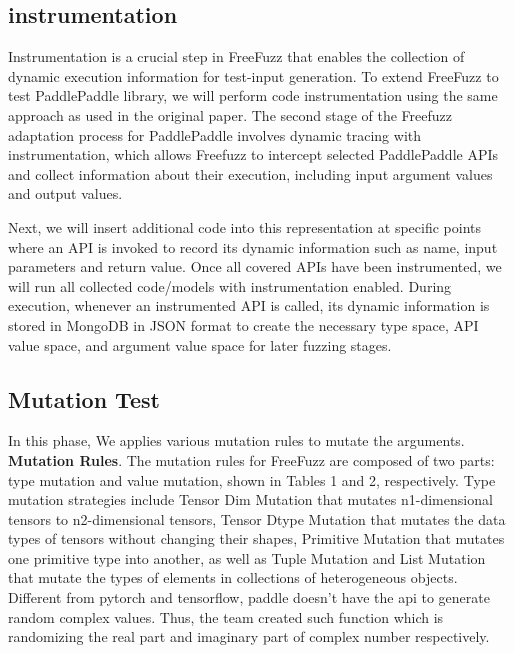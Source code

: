 \documentclass[sigconf]{acmart}
\begin{document}
  \subsection{instrumentation}
  

  Instrumentation is a crucial step in FreeFuzz that enables the collection of dynamic execution information for test-input generation. 
  To extend FreeFuzz to test PaddlePaddle library, we will perform code instrumentation using the same approach as used in the original paper.
  The second stage of the Freefuzz adaptation process for PaddlePaddle involves dynamic tracing with instrumentation, 
  which allows Freefuzz to intercept selected PaddlePaddle APIs and collect information about their execution, 
  including input argument values and output values. 

  Next, we will insert additional code into this representation at specific points where an API is invoked to record its dynamic information such as name, input parameters and return value.
  Once all covered APIs have been instrumented, we will run all collected code/models with instrumentation enabled. 
  During execution, whenever an instrumented API is called, its dynamic information is stored in MongoDB in JSON format to create the necessary type space, 
  API value space, and argument value space for later fuzzing stages.


  \subsection{Mutation Test}

  In this phase, We applies various mutation rules to mutate the arguments.\cite{w1}
  \newline \textbf{Mutation Rules}. The mutation rules for FreeFuzz are composed
  of two parts: type mutation and value mutation, shown in Tables 1
  and 2, respectively. Type mutation strategies include Tensor Dim
  Mutation that mutates n1-dimensional tensors to n2-dimensional
  tensors, Tensor Dtype Mutation that mutates the data types of tensors without changing their shapes, Primitive Mutation that mutates
  one primitive type into another, as well as Tuple Mutation and List
  Mutation that mutate the types of elements in collections of heterogeneous objects.\cite{w1}
  \newline Different from pytorch and tensorflow, paddle doesn't have the api to generate random complex values. Thus, the team
  created such function which is randomizing the real part and imaginary part of complex number respectively.
 
\end{document}
